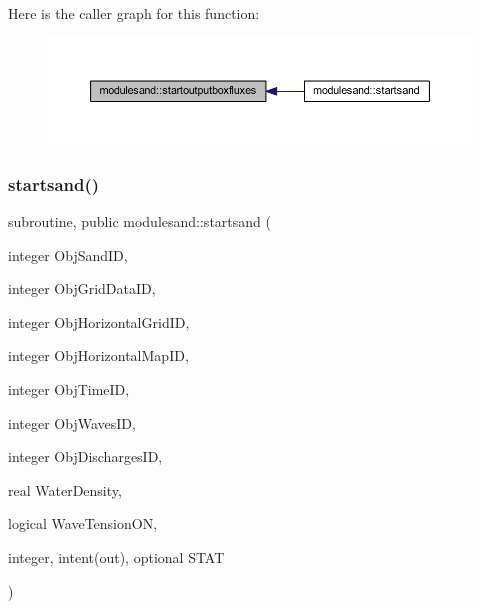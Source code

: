 Here is the caller graph for this function\+:\nopagebreak
\begin{figure}[H]
\begin{center}
\leavevmode
\includegraphics[width=350pt]{namespacemodulesand_a26a45201fee3769e27ba13227a832a22_icgraph}
\end{center}
\end{figure}
\mbox{\label{namespacemodulesand_a40b3b2fd3451026e5dc113c11bf6ad57}} 
\subsubsection{\texorpdfstring{startsand()}{startsand()}}
{\footnotesize\ttfamily subroutine, public modulesand\+::startsand (\begin{DoxyParamCaption}\item[{integer}]{Obj\+Sand\+ID,  }\item[{integer}]{Obj\+Grid\+Data\+ID,  }\item[{integer}]{Obj\+Horizontal\+Grid\+ID,  }\item[{integer}]{Obj\+Horizontal\+Map\+ID,  }\item[{integer}]{Obj\+Time\+ID,  }\item[{integer}]{Obj\+Waves\+ID,  }\item[{integer}]{Obj\+Discharges\+ID,  }\item[{real}]{Water\+Density,  }\item[{logical}]{Wave\+Tension\+ON,  }\item[{integer, intent(out), optional}]{S\+T\+AT }\end{DoxyParamCaption})}

